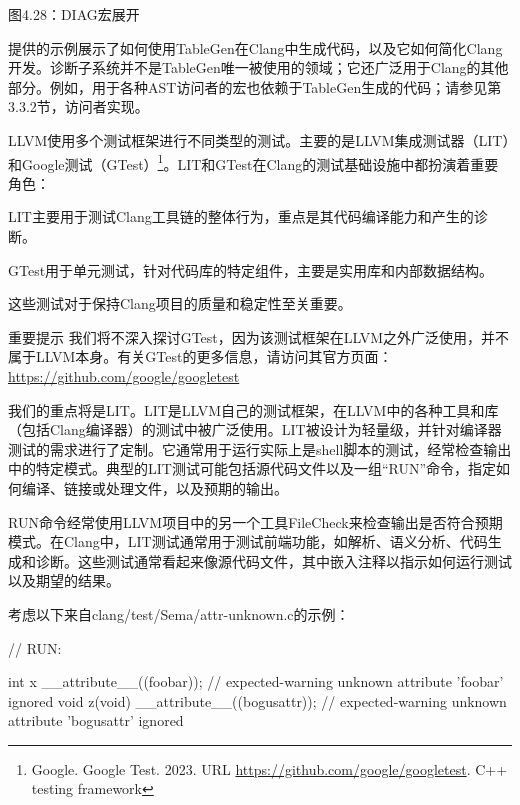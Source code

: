 \begin{center}
图4.28：DIAG宏展开
\end{center}

提供的示例展示了如何使用TableGen在Clang中生成代码，以及它如何简化Clang开发。诊断子系统并不是TableGen唯一被使用的领域；它还广泛用于Clang的其他部分。例如，用于各种AST访问者的宏也依赖于TableGen生成的代码；请参见第3.3.2节，访问者实现。


LLVM使用多个测试框架进行不同类型的测试。主要的是LLVM集成测试器（LIT）和Google测试（GTest）\footnote{Google. Google Test. 2023. URL \url{https://github.com/google/googletest}. C++ testing framework}。LIT和GTest在Clang的测试基础设施中都扮演着重要角色：

LIT主要用于测试Clang工具链的整体行为，重点是其代码编译能力和产生的诊断。

GTest用于单元测试，针对代码库的特定组件，主要是实用库和内部数据结构。

这些测试对于保持Clang项目的质量和稳定性至关重要。

\begin{myNotic}{重要提示}
我们将不深入探讨GTest，因为该测试框架在LLVM之外广泛使用，并不属于LLVM本身。有关GTest的更多信息，请访问其官方页面：\url{https://github.com/google/googletest}
\end{myNotic}

我们的重点将是LIT。LIT是LLVM自己的测试框架，在LLVM中的各种工具和库（包括Clang编译器）的测试中被广泛使用。LIT被设计为轻量级，并针对编译器测试的需求进行了定制。它通常用于运行实际上是shell脚本的测试，经常检查输出中的特定模式。典型的LIT测试可能包括源代码文件以及一组“RUN”命令，指定如何编译、链接或处理文件，以及预期的输出。

RUN命令经常使用LLVM项目中的另一个工具FileCheck来检查输出是否符合预期模式。在Clang中，LIT测试通常用于测试前端功能，如解析、语义分析、代码生成和诊断。这些测试通常看起来像源代码文件，其中嵌入注释以指示如何运行测试以及期望的结果。

考虑以下来自clang/test/Sema/attr-unknown.c的示例：

\begin{cpp}
// RUN: %

int x __attribute__((foobar)); // expected-warning {{unknown attribute 'foobar' ignored}}
void z(void) __attribute__((bogusattr)); // expected-warning {{unknown attribute 'bogusattr' ignored}}
\end{cpp}


